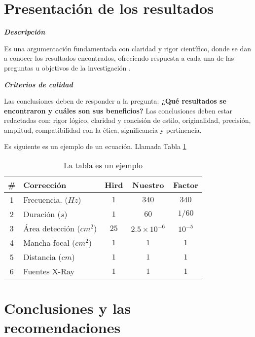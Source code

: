 
\section{Presentación de los resultados}

    \textbf{\textit{Descripción}}
    
    Es una argumentación fundamentada con claridad y rigor científico, donde se dan a conocer los resultados encontrados, ofreciendo respuesta a cada una de las preguntas u objetivos de la investigación \cite{knuthwebsite}.
    
    \textbf{\textit{Criterios de calidad}}
    
    Las conclusiones deben de responder a la pregunta: \textbf{¿Qué resultados se encontraron y cuáles son sus beneficios?}
    Las conclusiones deben estar redactadas con: rigor lógico, claridad y concisión de estilo, originalidad, precisión, amplitud, compatibilidad con la ética, significancia y pertinencia.
    
    Es siguiente es un ejemplo de un ecuación. Llamada Tabla \ref{tab:corr}
    
    \begin{table}[h!]
        \centering
        \begin{tabular}[c]{clccc} \hline
            \# & Corrección                 & Hird          & Nuestro                   & Factor \\  
            \hline
            1  & Frecuencia. ($Hz$)         & $1$           & $340$                     & $340$ \\
            2  & Duración ($s$)             & $1$           & $60$                      & $1/60$ \\
            3  & Área detección ($cm^2$)    & $25$          & $2.5\times 10^{-6}$       & $10^{-5}$ \\
            4  & Mancha focal ($cm^2$)      & $1$           & $1$                       & $1$ \\
            5  & Distancia ($cm$)           & $1$           & $1$                       & $1$ \\
            6  & Fuentes X-Ray              & $1$           & $1$                       & $1$ \\ \hline
        \end{tabular}
        \caption{La tabla es un ejemplo}
        \label{tab:corr}
    \end{table}

\section{Conclusiones y las recomendaciones}

